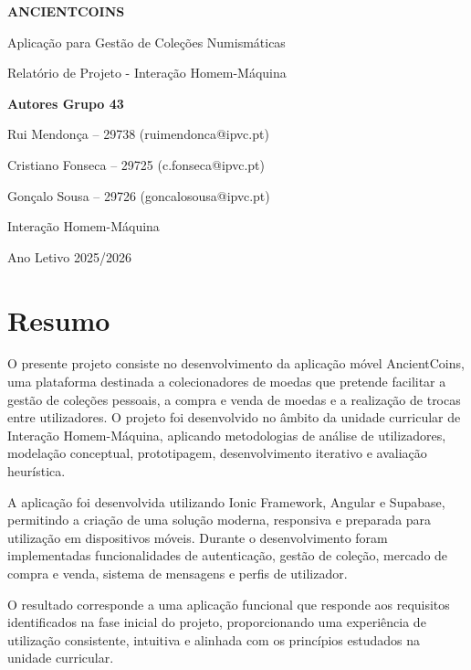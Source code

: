 \documentclass[12pt,a4paper]{article}
\begin{document}
\begin{titlepage}
\centering
\vspace*{2cm}
{\Huge\bfseries ANCIENTCOINS\par}
\vspace{0.6cm}
{\Large Aplicação para Gestão de Coleções Numismáticas\par}
\vspace{0.35cm}
{\large Relatório de Projeto - Interação Homem-Máquina\par}
\vfill
{\large\bfseries Autores Grupo 43\par}
Rui Mendonça -- 29738 (ruimendonca@ipvc.pt)\par
Cristiano Fonseca -- 29725 (c.fonseca@ipvc.pt)\par
Gonçalo Sousa -- 29726 (goncalosousa@ipvc.pt)\par
\vfill
Interação Homem-Máquina\par
Ano Letivo 2025/2026\par
\end{titlepage}

\tableofcontents
\newpage

\section*{Resumo}

O presente projeto consiste no desenvolvimento da aplicação móvel AncientCoins, uma plataforma destinada a colecionadores de moedas que pretende facilitar a gestão de coleções pessoais, a compra e venda de moedas e a realização de trocas entre utilizadores. O projeto foi desenvolvido no âmbito da unidade curricular de Interação Homem-Máquina, aplicando metodologias de análise de utilizadores, modelação conceptual, prototipagem, desenvolvimento iterativo e avaliação heurística.

A aplicação foi desenvolvida utilizando Ionic Framework, Angular e Supabase, permitindo a criação de uma solução moderna, responsiva e preparada para utilização em dispositivos móveis. Durante o desenvolvimento foram implementadas funcionalidades de autenticação, gestão de coleção, mercado de compra e venda, sistema de mensagens e perfis de utilizador.

O resultado corresponde a uma aplicação funcional que responde aos requisitos identificados na fase inicial do projeto, proporcionando uma experiência de utilização consistente, intuitiva e alinhada com os princípios estudados na unidade curricular.
\end{document}
